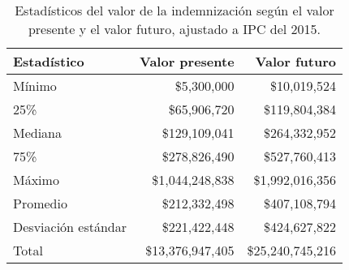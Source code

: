 \begin{table}[!htbp]
\centering
\caption{Estadísticos del valor de la indemnización según el valor presente
y el valor futuro, ajustado a IPC del 2015.} 
\label{tab:indemnizacion}
\begin{tabular}{lrr}
  \hline
Estadístico & Valor presente & Valor futuro \\ 
  \hline
Mínimo & \$5,300,000 & \$10,019,524 \\ 
  25\% & \$65,906,720 & \$119,804,384 \\ 
  Mediana & \$129,109,041 & \$264,332,952 \\ 
  75\% & \$278,826,490 & \$527,760,413 \\ 
  Máximo & \$1,044,248,838 & \$1,992,016,356 \\ 
  Promedio & \$212,332,498 & \$407,108,794 \\ 
  Desviación estándar & \$221,422,448 & \$424,627,822 \\ 
  Total & \$13,376,947,405 & \$25,240,745,216 \\ 
   \hline
\end{tabular}
\end{table}
